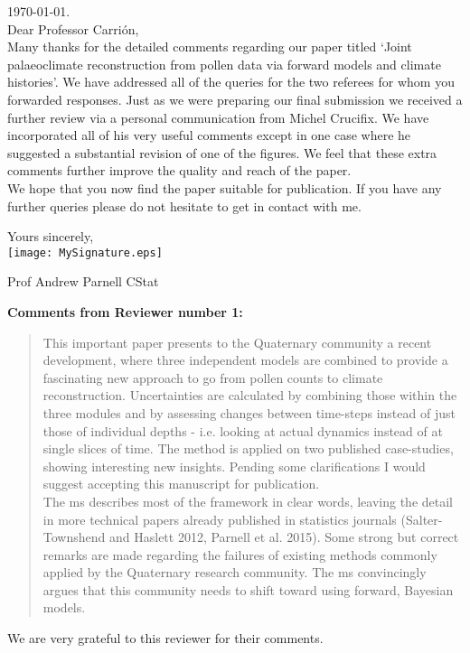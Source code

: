 \documentclass[a4paper,11pt]{article}
\begin{document}

\vspace{0.5cm}

\today. \\


Dear Professor  Carri\'{o}n,\\

Many thanks for the detailed comments regarding our paper titled `Joint palaeoclimate reconstruction from pollen data via forward models and climate histories'. We have addressed all of the queries for the two referees for whom you forwarded responses. Just as we were preparing our final submission we received a further review via a personal communication from Michel Crucifix. We have incorporated all of his very useful comments except in one case where he suggested a substantial revision of one of the figures. We feel that these extra comments further improve the quality and reach of the paper. \\

We hope that you now find the paper suitable for publication. If you have any further queries please do not hesitate to get in contact with me.\\

\vspace{0.5cm}

Yours sincerely,\\

\texttt{[image: MySignature.eps]}

Prof Andrew Parnell CStat \\

\newpage

\textbf{Comments from Reviewer number 1:}
\begin{framed} \begin{quote}
This important paper presents to the Quaternary community a recent development, where three independent models are combined to provide a fascinating new approach to go from pollen counts to climate reconstruction. Uncertainties are calculated by combining those within the three modules and by assessing changes between time-steps instead of just those of individual depths - i.e. looking at actual dynamics instead of at single slices of time. The method is applied on two published case-studies, showing interesting new insights. Pending some clarifications I would suggest accepting this manuscript for publication.\\

The ms describes most of the framework in clear words, leaving the detail in more technical papers already published in statistics journals (Salter-Townshend and Haslett 2012, Parnell et al. 2015). Some strong but correct remarks are made regarding the failures of existing methods commonly applied by the Quaternary research community. The ms convincingly argues that this community needs to shift toward using forward, Bayesian models.
\end{quote} \end{framed}
We are very grateful to this reviewer for their comments. 
\end{document}
